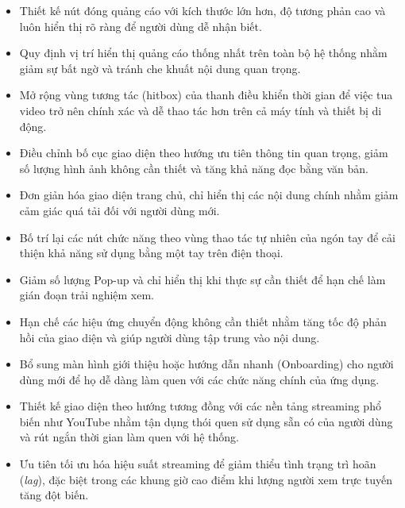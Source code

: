 \documentclass[a4paper,12pt]{article}
\begin{document}
\begin{itemize}
    \item Thiết kế nút đóng quảng cáo với kích thước lớn hơn, độ tương phản cao và luôn hiển thị rõ ràng để người dùng dễ nhận biết.
    
    \item Quy định vị trí hiển thị quảng cáo thống nhất trên toàn bộ hệ thống nhằm giảm sự bất ngờ và tránh che khuất nội dung quan trọng.
    
    \item Mở rộng vùng tương tác (hitbox) của thanh điều khiển thời gian để việc tua video trở nên chính xác và dễ thao tác hơn trên cả máy tính và thiết bị di động.
    
    \item Điều chỉnh bố cục giao diện theo hướng ưu tiên thông tin quan trọng, giảm số lượng hình ảnh không cần thiết và tăng khả năng đọc bằng văn bản.
    
    \item Đơn giản hóa giao diện trang chủ, chỉ hiển thị các nội dung chính nhằm giảm cảm giác quá tải đối với người dùng mới.
    
    \item Bố trí lại các nút chức năng theo vùng thao tác tự nhiên của ngón tay để cải thiện khả năng sử dụng bằng một tay trên điện thoại.
    
    \item Giảm số lượng Pop-up và chỉ hiển thị khi thực sự cần thiết để hạn chế làm gián đoạn trải nghiệm xem.
    
    \item Hạn chế các hiệu ứng chuyển động không cần thiết nhằm tăng tốc độ phản hồi của giao diện và giúp người dùng tập trung vào nội dung.
    
    \item Bổ sung màn hình giới thiệu hoặc hướng dẫn nhanh (Onboarding) cho người dùng mới để họ dễ dàng làm quen với các chức năng chính của ứng dụng.
    
    \item Thiết kế giao diện theo hướng tương đồng với các nền tảng streaming phổ biến như YouTube nhằm tận dụng thói quen sử dụng sẵn có của người dùng và rút ngắn thời gian làm quen với hệ thống.
    
    \item Ưu tiên tối ưu hóa hiệu suất streaming để giảm thiểu tình trạng trì hoãn (\textit{lag}), đặc biệt trong các khung giờ cao điểm khi lượng người xem trực tuyến tăng đột biến.
    

\end{itemize}
\end{document}
